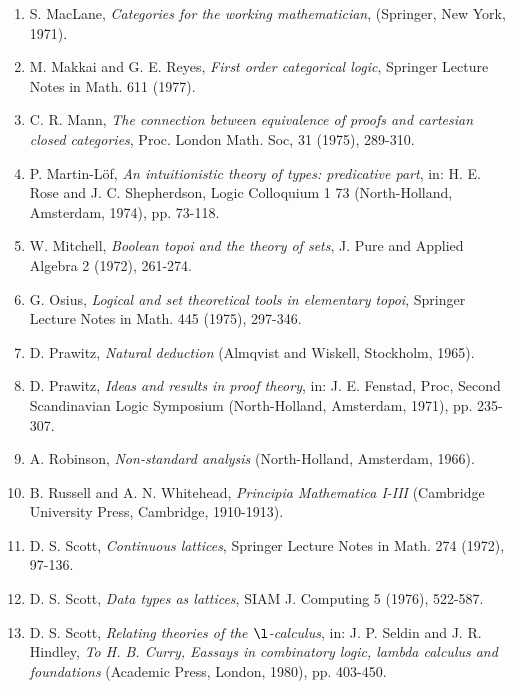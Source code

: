 \begin{enumerate}[leftmargin=*, widest=8888, align=left]
\item[] S. MacLane, {\em Categories for the working mathematician}, (Springer, New York,
1971).

\item[] M. Makkai and G. E. Reyes, {\em First order categorical logic}, Springer Lecture
Notes in Math. 611 (1977).

\item[] C. R. Mann, {\em The connection between equivalence of proofs and cartesian closed
categories}, Proc. London Math. Soc, 31 (1975), 289-310.

\item[] P. Martin-L\"of, {\em An intuitionistic theory of types: predicative part}, in:
H. E. Rose and J. C. Shepherdson, Logic Colloquium 1 73 (North-Holland,
Amsterdam, 1974), pp. 73-118.

\item[] W. Mitchell, {\em Boolean topoi and the theory of sets}, J. Pure and Applied Algebra
2 (1972), 261-274.

\item[] G. Osius, {\em Logical and set theoretical tools in elementary topoi}, Springer
Lecture Notes in Math. 445 (1975), 297-346.

\item[] D. Prawitz, {\em Natural deduction} (Almqvist and Wiskell, Stockholm, 1965).

\item[] D. Prawitz, {\em Ideas and results in proof theory}, in: J. E. Fenstad, Proc, Second
Scandinavian Logic Symposium (North-Holland, Amsterdam, 1971),
pp. 235-307.

\item[] A. Robinson, {\em Non-standard analysis} (North-Holland, Amsterdam, 1966).

\item[] B. Russell and A. N. Whitehead, {\em Principia Mathematica I-III} (Cambridge
University Press, Cambridge, 1910-1913).

\item[] D. S. Scott, {\em Continuous lattices}, Springer Lecture Notes in Math. 274 (1972),
97-136.

\item[] D. S. Scott, {\em Data types as lattices}, SIAM J. Computing 5 (1976), 522-587.

\item[] D. S. Scott, {\em Relating theories of the $\l$-calculus}, in: J. P. Seldin and J. R.
Hindley, {\em To H. B. Curry, Eassays in combinatory logic, lambda calculus
and foundations} (Academic Press, London, 1980), pp. 403-450.


\end{enumerate}
